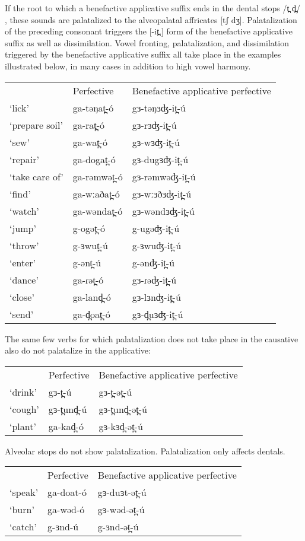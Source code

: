 If the root to which a benefactive applicative suffix ends in the dental stops /t̪ d̪/ , these sounds are palatalized to the alveopalatal affricates [tʃ dʒ]. Palatalization of the preceding consonant triggers the [-it̪.] form of the benefactive applicative suffix as well as dissimilation. Vowel fronting, palatalization, and dissimilation triggered by the benefactive applicative suffix all take place in the examples illustrated below, in many cases in addition to high vowel harmony.
\ea
\begin{tabular}[t]{lll}
&	Perfective	&	Benefactive applicative perfective\\
‘lick’ 			& ga-təŋat̪-ó	&	gɜ-təŋɜʤ-it̪-ú\\
‘prepare soil’	&	ga-rat̪-ó	&	gɜ-rɜʤ-it̪-ú\\
‘sew’			&	ga-wat̪-ó	&	gɜ-wɜʤ-it̪-ú\\
‘repair’		&	ga-dogat̪-ó	&	gɜ-dugɜʤ-it̪-ú\\
‘take care of’	&	ga-rəmwət̪-ó	&	gɜ-rəmwəʤ-it̪-ú\\
‘find’			&	ga-wːaðat̪-ó	&	gɜ-wːɜðɜʤ-it̪-ú\\
‘watch’			&	ga-wəndat̪-ó	&	gɜ-wəndɜʤ-it̪-ú\\
‘jump’			&	g-ogət̪-ó		&	g-ugəʤ-it̪-ú\\
‘throw’			&	g-ɜwut̪-ú		&	g-ɜwuʤ-it̪-ú\\
‘enter’			&	g-ənt̪-ú		&	g-ənʤ-it̪-ú\\
‘dance’			&	ga-ɾət̪-ó	&	gɜ-ɾəʤ-it̪-ú\\
‘close’			&	ga-land̪-ó	&	gɜ-lɜnʤ-it̪-ú\\
‘send’			&	ga-d̪oat̪-ó	&	gɜ-d̪uɜʤ-it̪-ú\\
\end{tabular}
\z
The same few verbs for which palatalization does not take place in the causative also do not palatalize in the applicative:

\ea
\begin{tabular}[t]{lll}
&	Perfective	&	Benefactive applicative perfective\\
‘drink’	&	gɜ-t̪-ú	&	gɜ-t̪-ət̪-ú\\
‘cough’	&	gɜ-t̪und̪-ú	&	gɜ-t̪und̪-ət̪-ú\\
‘plant’	&	ga-kad̪-ó	&	gɜ-kɜd̪-ət̪-ú\\
\end{tabular}
\z

Alveolar stops do not show palatalization. Palatalization only affects dentals. 
\ea
\begin{tabular}[t]{lll}
&	Perfective	&	Benefactive applicative perfective\\
‘speak’	&	ga-doat-ó	&	gɜ-duɜt-ət̪-ú\\
‘burn’	&	ga-wəd-ó	&	gɜ-wəd-ət̪-ú\\
‘catch’	&	g-ɜnd-ú	&	g-ɜnd-ət̪-ú\\
\end{tabular}
\z

